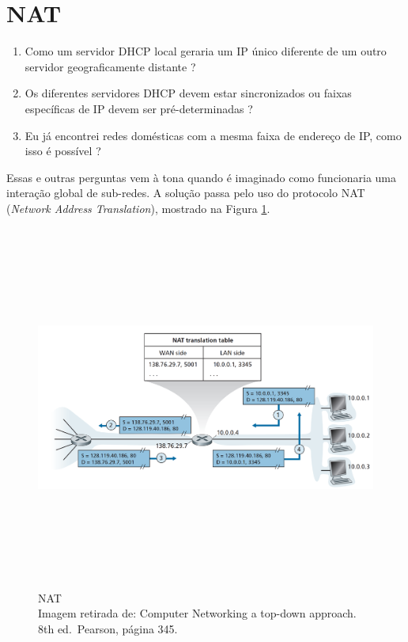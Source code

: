 \hypertarget{nat}{%
\section{NAT}\label{nat}}

\begin{enumerate}
\def\labelenumi{\arabic{enumi}.}
\tightlist
\item
  Como um servidor DHCP local geraria um IP único diferente de um outro
  servidor geograficamente distante ?
\item
  Os diferentes servidores DHCP devem estar sincronizados ou faixas
  específicas de IP devem ser pré-determinadas ?
\item
  Eu já encontrei redes domésticas com a mesma faixa de endereço de IP,
  como isso é possível ?
\end{enumerate}

Essas e outras perguntas vem à tona quando é imaginado como funcionaria
uma interação global de sub-redes. A solução passa pelo uso do protocolo
NAT (\emph{Network Address Translation}), mostrado na Figura \ref{NAT}.



\begin{figure}[h!]
\centering
\includegraphics[keepaspectratio, width=15cm, height=12cm]{imagens/13/13 - NAT.png}
\caption{NAT \\
Imagem retirada de: Computer Networking a top-down approach. 8th
ed.~Pearson, página 345. \\}
\label{NAT}
\end{figure}





